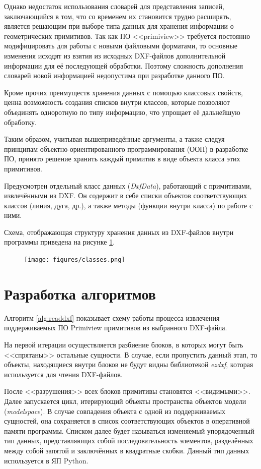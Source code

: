 Однако недостаток использования словарей для представления записей, заключающийся в том, что со временем их становится трудно расширять, является решающим при выборе типа данных для хранения информации о геометрических примитивов. Так как ПО <<primiview>> требуется постоянно модифицировать для работы с новыми файловыми форматами, то основные изменения исходят из взятия из исходных DXF-файлов дополнительной информации для её последующей обработки. Поэтому сложность дополнения словарей новой информацией недопустима при разработке данного ПО.

Кроме прочих преимуществ хранения данных с помощью классовых свойств, ценна возможность создания списков внутри классов, которые позволяют объединять одноротную по типу информацию, что упрощает её дальнейшую обработку.

Таким образом, учитывая вышеприведённые аргументы, а также следуя принципам объектно-ориентированного программирования (ООП) в разработке ПО, принято решение хранить каждый примитив в виде объекта класса этих примитивов.

Предусмотрен отдельный класс данных (\textit{DxfData}), работающий с примитивами, извлечёнными из DXF. Он содержит в себе списки объектов соответствующих классов (линия, дуга, др.), а также методы (функции внутри класса) по работе с ними.

Схема, отображающая структуру хранения данных из DXF-файлов внутри программы приведена на рисунке \ref{fig:classes}.

\begin{figure}[H]
	\centering
	\texttt{[image: figures/classes.png]}
	\label{fig:classes}
\end{figure}


\section{Разработка алгоритмов} \label{sec:algs}
Алгоритм \ref{alg:readdxf} показывает схему работы процесса извлечения поддерживаемых ПО Primiview примитивов из выбранного DXF-файла.

На первой итерации осуществляется разбиение блоков, в которых могут быть <<спрятаны>> остальные сущности. В случае, если пропустить данный этап, то объекты, находящиеся внутри блоков не будут видны библиотекой \textit{ezdxf}, которая используется для чтения DXF-файлов.

После <<разрушения>> всех блоков примитивы становятся <<видимыми>>. Далее запускается цикл, итерирующий объекты пространства объектов модели (\textit{modelspace}). В случае совпадения объекта с одной из поддерживаемых сущностей, она сохраняется в список соответствующих объектов в оперативной памяти программы. Списком далее будет называться изменяемый упорядоченный тип данных, представляющих собой последовательность элементов, разделённых между собой запятой и заключённых в квадратные скобки. Данный тип данных используется в ЯП Python.

